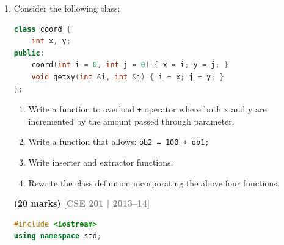 \documentclass[12pt,a3paper]{article}
\newcommand{\yr}[1]{\hfill\textcolor{gray}{\small\textbf{[#1]}}}
\newcommand{\mk}[1]{\textcolor{orange!70!black}{\small\textbf{(#1 marks)}}}
\begin{document}
\begin{enumerate}
\begin{tcolorbox}
\begin{lstlisting}[language=C++]
#include <iostream>
using namespace std;
class Complex {
    double re, im;
public:
    Complex(double r=0, double i=0): re(r), im(i){}
    Complex operator+(const Complex& o) const { return Complex(re+o.re,im+o.im); }
    Complex operator+(double n) const { return Complex(re+n, im); }
    friend Complex operator+(double n, const Complex& c){ return Complex(c.re+n,c.im); }
    Complex& operator++()    { re++; im++; return *this; }
    Complex  operator++(int) { Complex old=*this; re++; im++; return old; }
    void show() const { cout<<re<<"+"<<im<<"i\n"; }
};
int main(){
    Complex ob1(12,5), ob2, ob3(1,1);
    ob2=ob1+ob3;    ob2.show();      // 13+6i
    ob1++;          ob1.show();      // 13+6i
    ++ob1;          ob1.show();      // 14+7i
    ob2=ob1+100.0;  ob2.show();      // 114+7i
    ob2=100.0+ob1;  ob2.show();      // 114+7i
}
\end{lstlisting}

\end{tcolorbox}


\item Consider the following class:
\begin{lstlisting}[language=C++]
class coord {
    int x, y;
public:
    coord(int i = 0, int j = 0) { x = i; y = j; }
    void getxy(int &i, int &j) { i = x; j = y; }
};
\end{lstlisting}
\begin{enumerate}
  \item Write a function to overload \texttt{+} operator where both x and y are incremented by the amount passed through parameter.
  \item Write a function that allows: \texttt{ob2 = 100 + ob1;}
  \item Write inserter and extractor functions.
  \item Rewrite the class definition incorporating the above four functions.
\end{enumerate}
\mk{20}
\yr{CSE 201 | 2013--14}


\begin{tcolorbox}[enhanced,breakable,ansbox,colback=cF!4,colframe=cF,
  boxrule=0.8pt,arc=5pt,
  title={\textbf{Answer --- coord class full overloading}},
  fonttitle=\bfseries\color{white},colbacktitle=cF]

\begin{lstlisting}[language=C++]
#include <iostream>
using namespace std;


\end{lstlisting}
\end{tcolorbox}
\end{enumerate}
\end{document}
